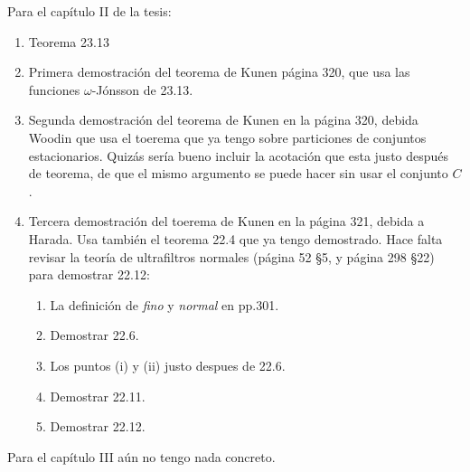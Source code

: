 \documentclass[12pt]{article}
\begin{document}
Para el capítulo II de la tesis:

\begin{enumerate}
    \item Teorema 23.13
    \item Primera demostración del teorema de Kunen página 320, que usa
        las funciones $\omega$-Jónsson de 23.13.
    \item Segunda demostración del teorema de Kunen en la página 320, debida Woodin que usa
        el toerema que ya tengo sobre particiones de conjuntos estacionarios.
        Quizás sería bueno incluir la acotación que esta justo después de teorema,
        de que el mismo argumento se puede hacer sin usar el conjunto $C$.
    \item Tercera demostración del toerema de Kunen en la página 321, debida a Harada.
        Usa también el teorema 22.4 que ya tengo demostrado.
        Hace falta revisar la teoría de ultrafiltros normales (página 52 \S5, y página 298 \S22)
        para demostrar 22.12:
        \begin{enumerate}
            \item La definición de \emph{fino} y \emph{normal} en pp.301.
            \item Demostrar 22.6.
            \item Los puntos (i) y (ii) justo despues de 22.6.
            \item Demostrar 22.11.
            \item Demostrar 22.12.
        \end{enumerate}
\end{enumerate}

Para el capítulo III aún no tengo nada concreto.
\end{document}
